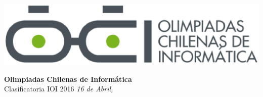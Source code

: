\documentclass[12pt]{oci}
\begin{document}
\begin{titlingpage}
  \begin{center}
  \includegraphics[scale=0.6]{logo.eps}

  \vskip 70pt
  \Large{\bf Olimpiadas Chilenas de Inform\'atica\\}
  \vskip 15pt
  \large{Clasificatoria IOI 2016}
  \vskip 10pt
  \normalsize{\it 16 de Abril, \the\year}


  \vskip 95pt

  \end{center}

\end{titlingpage}

\cleardoublepage






\end{document}
